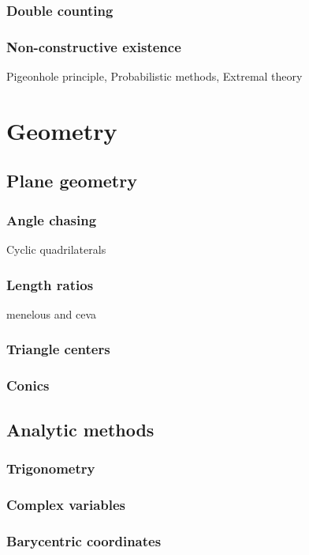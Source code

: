 \documentclass{../../large}
\begin{document}
\section{Double counting}
\section{Non-constructive existence}
Pigeonhole principle,
Probabilistic methods,
Extremal theory




\part{Geometry}
\chapter{Plane geometry}
\section{Angle chasing}
Cyclic quadrilaterals

\section{Length ratios}
menelous and ceva

\section{Triangle centers}

\section{Conics}



\chapter{Analytic methods}
\section{Trigonometry}
\section{Complex variables}
\section{Barycentric coordinates}
\end{document}
